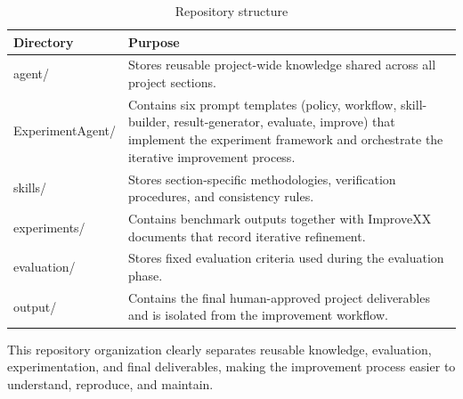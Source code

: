 \begin{table}[H]

	\centering

	\caption{Repository structure}

	\label{tab:repository}

	\begin{tabularx}{\linewidth}{>{\ttfamily}p{3cm}X}

		\toprule

		\textbf{Directory}
		 &
		\textbf{Purpose}

		\\

		\midrule

		agent/
		 &
		Stores reusable project-wide knowledge shared across all project sections.

		\\

		ExperimentAgent/
		 &
		Contains six prompt templates (policy, workflow, skill-builder, result-generator, evaluate, improve) that implement the experiment framework and orchestrate the iterative improvement process.

		\\

		skills/
		 &
		Stores section-specific methodologies, verification procedures, and consistency rules.

		\\

		experiments/
		 &
		Contains benchmark outputs together with ImproveXX documents that record iterative refinement.

		\\

		evaluation/
		 &
		Stores fixed evaluation criteria used during the evaluation phase.

		\\

		output/
		 &
		Contains the final human-approved project deliverables and is isolated from the improvement workflow.

		\\

		\bottomrule
	\end{tabularx}

\end{table}

This repository organization clearly separates reusable knowledge, evaluation, experimentation, and final deliverables, making the improvement process easier to understand, reproduce, and maintain.

